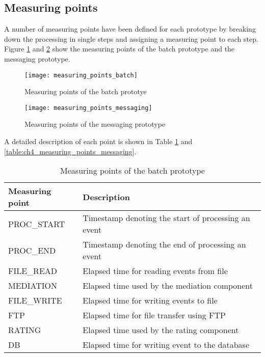 \subsection{Measuring points}
A number of measuring points have been defined for each prototype by breaking down the processing in single steps and assigning a measuring point to each step. Figure \ref{fig:ch4_measuring_points_batch} and \ref{fig:ch4_measuring_points_messaging} show the measuring points of the batch prototype and the messaging prototype. 

\begin{figure}[htpb]
	\centering
	\texttt{[image: measuring\_points\_batch]}
	\caption{Measuring points of the batch prototye}
	\label{fig:ch4_measuring_points_batch}
\end{figure}

\begin{figure}[htpb]
	\centering
	\texttt{[image: measuring\_points\_messaging]}
	\caption{Measuring points of the messaging prototype}
	\label{fig:ch4_measuring_points_messaging}
\end{figure}

A detailed description of each point is shown in Table \ref{table:ch4_measuring_points_batch} and \ref{table:ch4_measuring_points_messaging}.

\begin{table}
	\centering
	\begin{tabularx}{\textwidth}{@{} l X @{}}
		\caption{Measuring points of the batch prototype} \label{table:ch4_measuring_points_batch}\\
		\toprule
		\bfseries Measuring point & \bfseries Description\\
		\midrule
		PROC\_START & Timestamp denoting the start of processing an event\\
		\midrule
		PROC\_END & Timestamp denoting the end of processing an event\\
		\midrule
		FILE\_READ & Elapsed time for reading events from file\\
		\midrule
		MEDIATION & Elapsed time used by the mediation component\\
		\midrule
		FILE\_WRITE & Elapsed time for writing events to file\\
		\midrule
		FTP & Elapsed time for file transfer using FTP\\
		\midrule
		RATING & Elapsed time used by the rating component\\
		\midrule
		DB & Elapsed time for writing event to the database\\
		\bottomrule 
	\end{tabularx}
\end{table}

